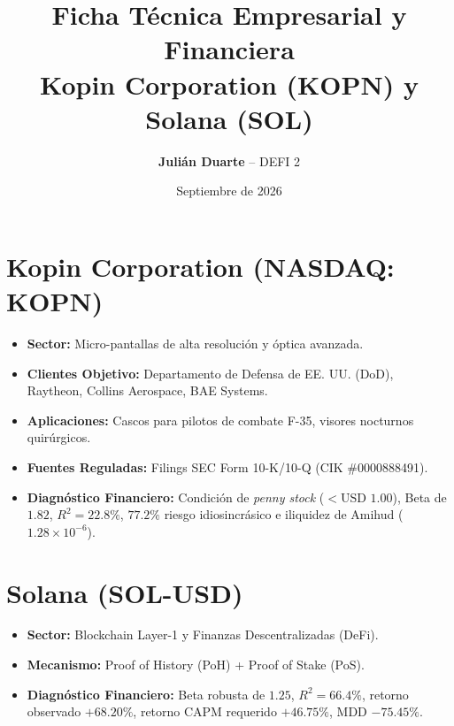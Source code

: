 \documentclass[11pt,a4paper]{article}
\title{\textbf{Ficha Técnica Empresarial y Financiera}\\\large\textmd{Kopin Corporation (KOPN) y Solana (SOL)}}
\author{\textbf{Julián Duarte} -- DEFI 2}
\date{Septiembre de 2026}
\begin{document}
\maketitle

\section{Kopin Corporation (NASDAQ: KOPN)}
\begin{itemize}
    \item \textbf{Sector:} Micro-pantallas de alta resolución y óptica avanzada.
    \item \textbf{Clientes Objetivo:} Departamento de Defensa de EE. UU. (DoD), Raytheon, Collins Aerospace, BAE Systems.
    \item \textbf{Aplicaciones:} Cascos para pilotos de combate F-35, visores nocturnos quirúrgicos.
    \item \textbf{Fuentes Reguladas:} Filings SEC Form 10-K/10-Q (CIK \#0000888491).
    \item \textbf{Diagnóstico Financiero:} Condición de \textit{penny stock} ($<\text{USD }1.00$), Beta de $1.82$, $R^2 = 22.8\%$, $77.2\%$ riesgo idiosincrásico e iliquidez de Amihud ($1.28 \times 10^{-6}$).
\end{itemize}

\section{Solana (SOL-USD)}
\begin{itemize}
    \item \textbf{Sector:} Blockchain Layer-1 y Finanzas Descentralizadas (DeFi).
    \item \textbf{Mecanismo:} Proof of History (PoH) + Proof of Stake (PoS).
    \item \textbf{Diagnóstico Financiero:} Beta robusta de $1.25$, $R^2 = 66.4\%$, retorno observado $+68.20\%$, retorno CAPM requerido $+46.75\%$, MDD $-75.45\%$.
\end{itemize}
\end{document}
